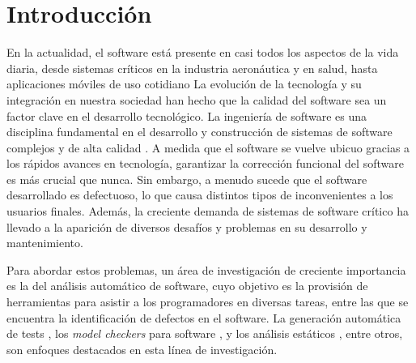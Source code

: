 \chapter[Introducción]{Introducción}
\label{cap:introduccion}



En la actualidad, el software está presente en casi todos los aspectos de la vida diaria, desde sistemas críticos en la industria aeronáutica y en salud, hasta aplicaciones móviles de uso cotidiano \cite{}  La evolución de la tecnología y su integración en nuestra sociedad han hecho que la calidad del software sea un factor clave en el desarrollo tecnológico. La ingeniería de software es una disciplina fundamental en el desarrollo y construcción de sistemas de software complejos y de alta calidad \cite{} . 
A medida que el software se vuelve ubicuo gracias a los rápidos avances en tecnología, garantizar la corrección funcional del software es más crucial que nunca. Sin embargo, a menudo sucede que el software desarrollado es defectuoso, lo que causa distintos tipos de inconvenientes a los usuarios finales.
Además, la creciente demanda de sistemas de software crítico ha llevado a la aparición de diversos desafíos y problemas en su desarrollo y mantenimiento.

Para abordar estos problemas, un área de investigación de creciente importancia es la del análisis automático de software, cuyo objetivo es la provisión de herramientas para asistir a los programadores en diversas tareas, entre las que se encuentra la identificación de defectos en el software. La generación automática de tests \cite{Ponzio:2016, Rosner15, Abad13, Galeotti:2010, Khalek:2011, Pasareanu:2010, Gligoric10, Tillmann:2008, Pacheco07}, los \emph{model checkers} para software \cite{Visser06, Visser05, Clarke:2004}, y los análisis estáticos \cite{Calcagno:2011, Itzhaky:2014}, entre otros, son enfoques destacados en esta línea de investigación.

